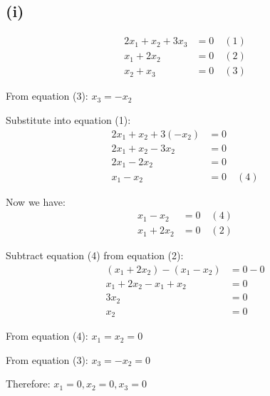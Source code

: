 \subsection*{(i)}
\begin{align*}
	2x_1 + x_2 + 3x_3 & = 0 \quad (1) \\
	x_1 + 2x_2        & = 0 \quad (2) \\
	x_2 + x_3         & = 0 \quad (3)
\end{align*}

From equation (3): $x_3 = -x_2$

Substitute into equation (1):
\begin{align*}
	2x_1 + x_2 + 3(-x_2) &= 0 \\
	2x_1 + x_2 - 3x_2 &= 0 \\
	2x_1 - 2x_2 &= 0 \\
	x_1 - x_2 &= 0 \quad (4)
\end{align*}

Now we have:
\begin{align*}
	x_1 - x_2 &= 0 \quad (4) \\
	x_1 + 2x_2 &= 0 \quad (2)
\end{align*}

Subtract equation (4) from equation (2):
\begin{align*}
	(x_1 + 2x_2) - (x_1 - x_2) &= 0 - 0 \\
	x_1 + 2x_2 - x_1 + x_2 &= 0 \\
	3x_2 &= 0 \\
	x_2 &= 0
\end{align*}

From equation (4): $x_1 = x_2 = 0$

From equation (3): $x_3 = -x_2 = 0$

Therefore: $x_1 = 0, x_2 = 0, x_3 = 0$